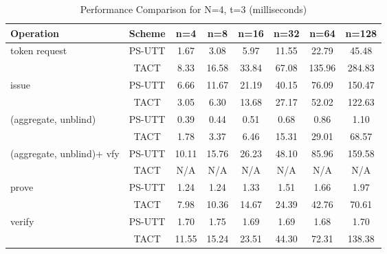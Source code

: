 \begin{table}[htbp]
\centering
\caption{Performance Comparison for N=4, t=3 (milliseconds)}
\begin{tabular}{lccccccc}
\toprule
\textbf{Operation} & \textbf{Scheme} & \textbf{n=4} & \textbf{n=8} & \textbf{n=16} & \textbf{n=32} & \textbf{n=64} & \textbf{n=128} \\
\midrule
token request & PS-UTT & 1.67 & 3.08 & 5.97 & 11.55 & 22.79 & 45.48 \\
 & TACT & 8.33 & 16.58 & 33.84 & 67.08 & 135.96 & 284.83 \\
\midrule
issue & PS-UTT & 6.66 & 11.67 & 21.19 & 40.15 & 76.09 & 150.47 \\
 & TACT & 3.05 & 6.30 & 13.68 & 27.17 & 52.02 & 122.63 \\
\midrule
(aggregate, unblind) & PS-UTT & 0.39 & 0.44 & 0.51 & 0.68 & 0.86 & 1.10 \\
 & TACT & 1.78 & 3.37 & 6.46 & 15.31 & 29.01 & 68.57 \\
\midrule
(aggregate, unblind)+ vfy & PS-UTT & 10.11 & 15.76 & 26.23 & 48.10 & 85.96 & 159.58 \\
 & TACT & N/A & N/A & N/A & N/A & N/A & N/A \\
\midrule
prove & PS-UTT & 1.24 & 1.24 & 1.33 & 1.51 & 1.66 & 1.97 \\
 & TACT & 7.98 & 10.36 & 14.67 & 24.39 & 42.76 & 70.61 \\
\midrule
verify & PS-UTT & 1.70 & 1.75 & 1.69 & 1.69 & 1.68 & 1.70 \\
 & TACT & 11.55 & 15.24 & 23.51 & 44.30 & 72.31 & 138.38 \\
\bottomrule
\end{tabular}
\label{tab:perf-comp-4-3}
\end{table}



